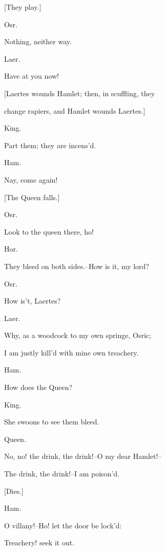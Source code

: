 \documentclass[12pt]{book}
\begin{document}
[They play.]



Osr.

Nothing, neither way.



Laer.

Have at you now!



[Laertes wounds Hamlet; then, in scuffling, they

change rapiers, and Hamlet wounds Laertes.]



King.

Part them; they are incens'd.



Ham.

Nay, come again!



[The Queen falls.]



Osr.

Look to the queen there, ho!



Hor.

They bleed on both sides.--How is it, my lord?



Osr.

How is't, Laertes?



Laer.

Why, as a woodcock to my own springe, Osric;

I am justly kill'd with mine own treachery.



Ham.

How does the Queen?



King.

She swoons to see them bleed.



Queen.

No, no! the drink, the drink!--O my dear Hamlet!--

The drink, the drink!--I am poison'd.



[Dies.]



Ham.

O villany!--Ho! let the door be lock'd:

Treachery! seek it out.
\end{document}
